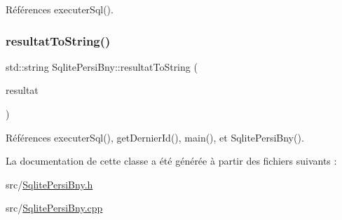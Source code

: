 Références executer\+Sql().

\mbox{\label{classSqlitePersiBny_a6c80449c682a18e9e9ce0a860f05088d}} 
\subsubsection{\texorpdfstring{resultat\+To\+String()}{resultatToString()}}
{\footnotesize\ttfamily std\+::string Sqlite\+Persi\+Bny\+::resultat\+To\+String (\begin{DoxyParamCaption}\item[{\hyperlink{classSqlitePersiBny_a04bdd1bacd9241210ea44ec2c072f79b}{Sqlite\+Persi\+Bny\+::\+Resultat} \&}]{resultat }\end{DoxyParamCaption})\hspace{0.3cm}{\ttfamily [static]}}



Références executer\+Sql(), get\+Dernier\+Id(), main(), et Sqlite\+Persi\+Bny().



La documentation de cette classe a été générée à partir des fichiers suivants \+:\begin{DoxyCompactItemize}
\item 
src/\hyperlink{SqlitePersiBny_8h}{Sqlite\+Persi\+Bny.\+h}\item 
src/\hyperlink{SqlitePersiBny_8cpp}{Sqlite\+Persi\+Bny.\+cpp}\end{DoxyCompactItemize}
